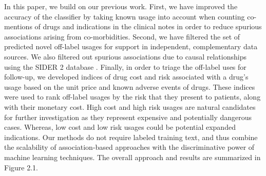 In this paper, we build on our previous work. First, we have improved
the accuracy of the classifier by taking known usage into account when
counting co-mentions of drugs and indications in the clinical notes in
order to reduce spurious associations arising from co-morbidities.
Second, we have filtered the set of predicted novel off-label usages
for support in independent, complementary data sources.  We also
filtered out spurious associations due to causal relationships using
the SIDER 2 database \cite{Kuhn2010}.  Finally, in order to triage the
off-label uses for follow-up, we developed indices of drug cost and
risk associated with a drug’s usage based on the unit price and known
adverse events of drugs.  These indices were used to rank off-label
usages by the risk that they present to patients, along with their
monetary cost.  High cost and high risk usages are natural candidates
for further investigation as they represent expensive and potentially
dangerous cases.  Whereas, low cost and low risk usages could be
potential expanded indications.  Our methods do not require labeled
training text, and thus combine the scalability of association-based
approaches with the discriminative power of machine learning
techniques.  The overall approach and results are summarized in Figure
2.1.

